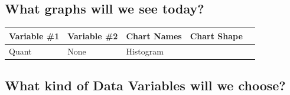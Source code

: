 \documentclass[
  letterpaper,
  DIV=11,
  numbers=noendperiod,
  oneside]{scrartcl}
\begin{document}
\subsection{\texorpdfstring{ What graphs will we see
today?}{ What graphs will we see today?}}\label{what-graphs-will-we-see-today}

\begin{longtable}[]{@{}
  >{\centering\arraybackslash}p{}
  >{\centering\arraybackslash}p{}
  >{\centering\arraybackslash}p{}
  >{\centering\arraybackslash}p{}
  >{\centering\arraybackslash}p{}@{}}
\toprule\noalign{}
\begin{minipage}[b]{\linewidth}\centering
Variable \#1
\end{minipage} & \begin{minipage}[b]{\linewidth}\centering
Variable \#2
\end{minipage} & \begin{minipage}[b]{\linewidth}\centering
Chart Names
\end{minipage} & \begin{minipage}[b]{\linewidth}\centering
Chart Shape
\end{minipage} & \begin{minipage}[b]{\linewidth}\centering
\end{minipage} \\
\midrule\noalign{}
\endhead
\bottomrule\noalign{}
\endlastfoot
Quant & None & Histogram & & \\
\end{longtable}

\subsection{\texorpdfstring{ What kind of Data Variables will we
choose?}{ What kind of Data Variables will we choose?}}\label{what-kind-of-data-variables-will-we-choose}
\end{document}
